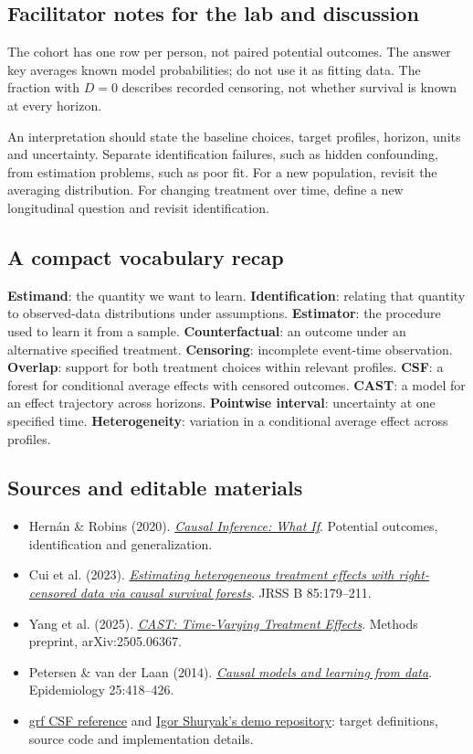 \documentclass[11pt,letterpaper]{article}
\newcommand{\term}[1]{\textbf{\color{ink}#1}}
\begin{document}
\subsection{Facilitator notes for the lab and discussion}
The cohort has one row per person, not paired potential outcomes. The answer
key averages known model probabilities; do not use it as fitting data.
The fraction with $D=0$ describes recorded censoring, not whether survival is
known at every horizon.

An interpretation should state the baseline choices, target profiles, horizon,
units and uncertainty. Separate identification failures, such as hidden
confounding, from estimation problems, such as poor fit. For a new population,
revisit the averaging distribution. For changing treatment over time, define
a new longitudinal question and revisit identification.

\subsection{A compact vocabulary recap}
\term{Estimand}: the quantity we want to learn. \term{Identification}: relating
that quantity to observed-data distributions under assumptions.
\term{Estimator}: the procedure used to learn it from a sample.
\term{Counterfactual}: an outcome under an alternative specified treatment.
\term{Censoring}: incomplete event-time observation.
\term{Overlap}: support for both treatment choices within relevant profiles.
\term{CSF}: a forest for conditional average effects with censored outcomes.
\term{CAST}: a model for an effect trajectory across horizons.
\term{Pointwise interval}: uncertainty at one specified time.
\term{Heterogeneity}: variation in a conditional average effect across profiles.

\subsection{Sources and editable materials}
{\small
\begin{itemize}[itemsep=3pt]
\item Hern\'an \& Robins (2020). \href{https://miguelhernan.org/whatifbook}{\emph{Causal Inference: What If}}. Potential outcomes, identification and generalization.
\item Cui et al. (2023). \href{https://doi.org/10.1093/jrsssb/qkac001}{\emph{Estimating heterogeneous treatment effects with right-censored data via causal survival forests}}. JRSS B 85:179--211.
\item Yang et al. (2025). \href{https://arxiv.org/abs/2505.06367}{\emph{CAST: Time-Varying Treatment Effects}}. Methods preprint, arXiv:2505.06367.
\item Petersen \& van der Laan (2014). \href{https://doi.org/10.1097/EDE.0000000000000078}{\emph{Causal models and learning from data}}. Epidemiology 25:418--426.
\item \href{https://grf-labs.github.io/grf/reference/causal_survival_forest.html}{grf CSF reference} and \href{https://github.com/ishuryak/cast_demo_website}{Igor Shuryak's demo repository}: target definitions, source code and implementation details.
\end{itemize}}
\end{document}
